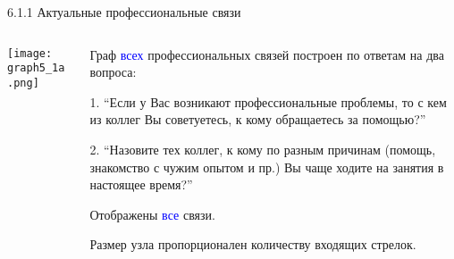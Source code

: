 \begin{frame}{6.1.1 Актуальные профессиональные связи}

\begin{columns} 
\begin{column}{0.75\textwidth} 
\centering
          \texttt{[image: graph5\_1a.png]}
\end{column}
\begin{column}{0.25\textwidth} 

\tiny
Граф \textcolor{blue}{всех} профессиональных связей построен по ответам на два вопроса:
\smallskip

1. ``Если у Вас возникают профессиональные проблемы, то с кем из коллег Вы советуетесь, к кому обращаетесь за помощью?''
\smallskip

2. ``Назовите тех коллег, к кому по разным причинам (помощь, знакомство с чужим опытом и пр.) Вы чаще ходите на занятия в настоящее время?''
\smallskip

Отображены \textcolor{blue}{все} связи. 
\smallskip

Размер узла пропорционален количеству входящих стрелок.

\end{column}
\end{columns}
\end{frame}


